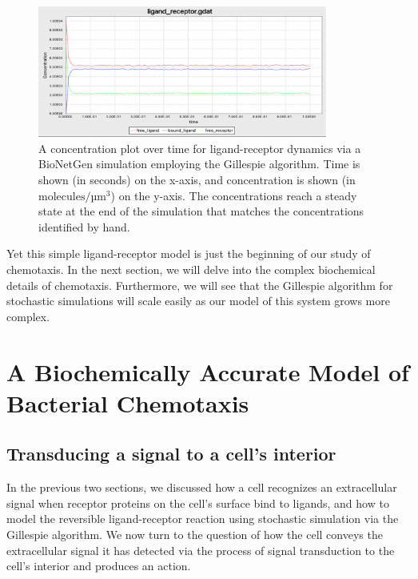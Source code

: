 \begin{figure}[h]
\centering
\mySfFamily
\includegraphics[width = 0.85\textwidth]{../images/chemotaxis_tutorial4_ssa.png}
\caption{A concentration plot over time for ligand-receptor dynamics via a BioNetGen simulation employing the Gillespie algorithm. Time is shown (in seconds) on the x-axis, and concentration is shown (in $\text{molecules}/\text{µm}^\text{3}$) on the y-axis. The concentrations reach a steady state at the end of the simulation that matches the concentrations identified by hand.}
\label{fig:chemotaxis_tutorial4_ssa}
\end{figure}

Yet this simple ligand-receptor model is just the beginning of our study of chemotaxis. In the next section, we will delve into the complex biochemical details of chemotaxis. Furthermore, we will see that the Gillespie algorithm for stochastic simulations will scale easily as our model of this system grows more complex.\\

\FloatBarrier
{}

\section{A Biochemically Accurate Model of Bacterial Chemotaxis}
\label{sec:a_biochemically_accurate_model_of_bacterial_chemotaxis}

\subsection{Transducing a signal to a cell's interior}

In the previous two sections, we discussed how a cell recognizes an extracellular signal when receptor proteins on the cell's surface bind to ligands, and how to model the reversible ligand-receptor reaction using stochastic simulation via the Gillespie algorithm. We now turn to the question of how the cell conveys the extracellular signal it has detected via the process of signal transduction to the cell's interior and produces an action.

